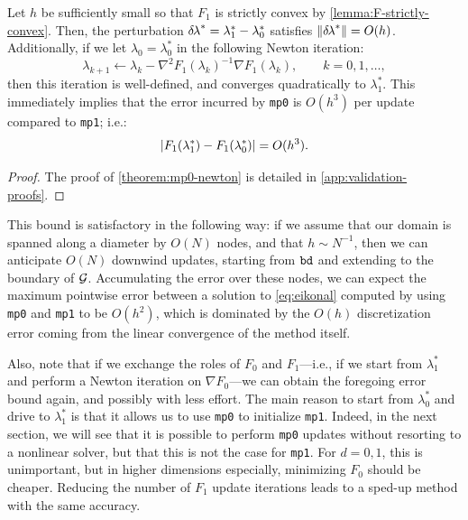 \documentclass[sisc-eikonal.tex]{subfiles}
\begin{document}
\begin{theorem}\label{theorem:mp0-newton}
  Let $h$ be sufficiently small so that $F_1$ is strictly convex by
  \cref{lemma:F-strictly-convex}. Then, the perturbation
  ${\delta \hspace{-0.1em} \lambda}^* = \lambda_1^* - \lambda_0^*$ satisfies
  $\left\|{\delta \hspace{-0.1em} \lambda}^*\right\| = O(h)$. Additionally, if we let
  $\lambda_0 = \lambda_0^*$ in the following Newton iteration:
  \begin{equation}
    \label{eq:lam0-iter-to-lam1}
    \lambda_{k+1} \gets \lambda_k - \nabla^2 F_1(\lambda_k)^{-1} \nabla F_1(\lambda_k), \qquad k = 0, 1, \hdots,
  \end{equation}
  then this iteration is well-defined, and converges quadratically to
  $\lambda_1^*$. This immediately implies that the error incurred by
  \texttt{mp0} is $O(h^3)$ per update compared to \texttt{mp1}; i.e.:
  \begin{equation}
    \label{eq:mp0-error}
    \abs{F_1(\lambda_1^*) - F_1(\lambda_0^*)} = O(h^3).
  \end{equation}
\end{theorem}

\begin{proof}
  The proof of \cref{theorem:mp0-newton} is detailed in
  \cref{app:validation-proofs}.
\end{proof}

This bound is satisfactory in the following way: if we assume that our
domain is spanned along a diameter by $O(N)$ nodes, and that
$h \sim N^{-1}$, then we can anticipate $O(N)$ downwind updates,
starting from $\texttt{bd}$ and extending to the boundary of
$\mathcal{G}$. Accumulating the error over these nodes, we can expect the
maximum pointwise error between a solution to \cref{eq:eikonal}
computed by using \texttt{mp0} and \texttt{mp1} to be $O(h^2)$, which
is dominated by the $O(h)$ discretization error coming from the linear
convergence of the method itself.

Also, note that if we exchange the roles of $F_0$ and $F_1$---i.e., if
we start from $\lambda_1^*$ and perform a Newton iteration on
$\nabla F_0$---we can obtain the foregoing error bound again, and
possibly with less effort. The main reason to start from $\lambda_0^*$
and drive to $\lambda_1^*$ is that it allows us to use \texttt{mp0} to
initialize \texttt{mp1}. Indeed, in the next section, we will see that
it is possible to perform \texttt{mp0} updates without resorting to a
nonlinear solver, but that this is not the case for \texttt{mp1}. For
$d = 0, 1$, this is unimportant, but in higher dimensions especially,
minimizing $F_0$ should be cheaper. Reducing the number of $F_1$
update iterations leads to a sped-up method with the same accuracy.
\end{document}
